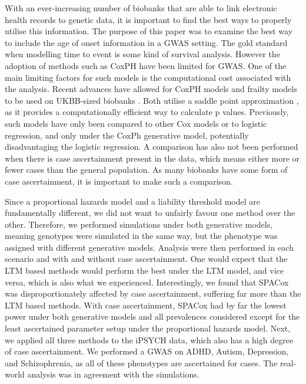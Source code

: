 
With an ever-increasing number of biobanks that are able to link electronic health records to genetic data, it is important to find the best ways to properly utilise this information. The purpose of this paper was to examine the best way to include the age of onset information in a GWAS setting. The gold standard when modelling time to event is some kind of survival analysis. However the adoption of methods such as CoxPH have been limited for GWAS. One of the main limiting factors for such models is the computational cost associated with the analysis. Recent advances have allowed for CoxPH models and frailty models to be used on UKBB-sized biobanks \cite{bi2020fast,dey2022efficient}. Both utilise a saddle point approximation \cite{daniels1954saddlepoint}, as it provides a computationally efficient way to calculate p values. Previously, such models have only been compared to other Cox models or to logistic regression, and only under the CoxPh generative model, potentially disadvantaging the logistic regression. A comparison has also not been performed when there is case ascertainment present in the data, which means either more or fewer cases than the general population. As many biobanks have some form of case ascertainment, it is important to make such a comparison. 



Since a proportional hazards model and a liability threshold model are fundamentally different, we did not want to unfairly favour one method over the other. Therefore, we performed simulations under both generative models, meaning genotypes were simulated in the same way, but the phenotype was assigned with different generative models. Analysis were then performed in each scenario and with and without case ascertainment. One would expect that the LTM based methods would perform the best under the LTM model, and vice versa, which is also what we experienced. Interestingly, we found that SPACox was disproportionately affected by case ascertainment, suffering far more than the LTM based methods. With case ascertainment, SPACox had by far the lowest power under both generative models and all prevalences considered except for the least ascertained parameter setup under the proportional hazards model. Next, we applied all three methods to the iPSYCH data, which also has a high degree of case ascertainment. We performed a GWAS on ADHD, Autism, Depression, and Schizophrenia, as all of these phenotypes are ascertained for cases. The real-world analysis was in agreement with the simulations. 

